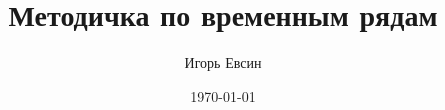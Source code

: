 
\title{Методичка по временным рядам}
\author{Игорь Евсин}
\date{\today}

\maketitle

\newpage
{}
\tableofcontents
\newpage
{}